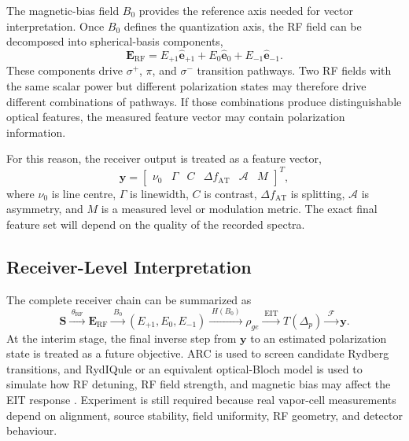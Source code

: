 \documentclass{ieeeaccess}
\begin{document}
The magnetic-bias field \(B_0\) provides the reference axis needed for vector interpretation. Once \(B_0\) defines the quantization axis, the RF field can be decomposed into spherical-basis components,
\begin{equation}
\mathbf{E}_{\mathrm{RF}}=
E_{+1}\hat{\mathbf{e}}_{+1}+E_0\hat{\mathbf{e}}_0+E_{-1}\hat{\mathbf{e}}_{-1}.
\label{eq:bg_spherical_decomposition}
\end{equation}
These components drive \(\sigma^+\), \(\pi\), and \(\sigma^-\) transition pathways. Two RF fields with the same scalar power but different polarization states may therefore drive different combinations of pathways. If those combinations produce distinguishable optical features, the measured feature vector may contain polarization information.

For this reason, the receiver output is treated as a feature vector,
\begin{equation}
\mathbf{y}=\begin{bmatrix}
\nu_0&\Gamma&C&\Delta f_{\mathrm{AT}}&\mathcal{A}&M
\end{bmatrix}^{T},
\label{eq:bg_feature_vector}
\end{equation}
where \(\nu_0\) is line centre, \(\Gamma\) is linewidth, \(C\) is contrast, \(\Delta f_{\mathrm{AT}}\) is splitting, \(\mathcal{A}\) is asymmetry, and \(M\) is a measured level or modulation metric. The exact final feature set will depend on the quality of the recorded spectra.

\subsection{Receiver-Level Interpretation}
\label{subsec:bg_receiver_interpretation}

The complete receiver chain can be summarized as
\begin{equation}
\mathbf{S}\xrightarrow{\;\theta_{\mathrm{RF}}\;}\mathbf{E}_{\mathrm{RF}}
\xrightarrow{\;B_0\;}(E_{+1},E_0,E_{-1})
\xrightarrow{\;H(B_0)\;}\rho_{ge}
\xrightarrow{\;\mathrm{EIT}\;}T(\Delta_p)
\xrightarrow{\;\mathcal{F}\;}\mathbf{y}.
\label{eq:bg_receiver_chain}
\end{equation}
At the interim stage, the final inverse step from \(\mathbf{y}\) to an estimated polarization state is treated as a future objective. ARC is used to screen candidate Rydberg transitions, and RydIQule or an equivalent optical-Bloch model is used to simulate how RF detuning, RF field strength, and magnetic bias may affect the EIT response \cite{Sibalic2017ARC,Rydiqule2024}. Experiment is still required because real vapor-cell measurements depend on alignment, source stability, field uniformity, RF geometry, and detector behaviour.
\end{document}
